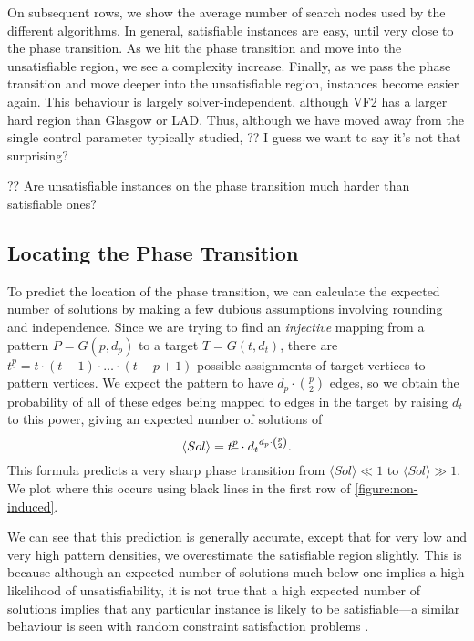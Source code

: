 \documentclass[letterpaper]{article}
\begin{document}
On subsequent rows, we show the average number of search nodes used by the different algorithms. In
general, satisfiable instances are easy, until very close to the phase transition. As we hit the
phase transition and move into the unsatisfiable region, we see a complexity increase. Finally, as
we pass the phase transition and move deeper into the unsatisfiable region, instances become easier
again. This behaviour is largely solver-independent, although VF2 has a larger hard region than
Glasgow or LAD. Thus, although we have moved away from the single control parameter typically
studied, ?? I guess we want to say it's not that surprising?

?? Are unsatisfiable instances on the phase transition much harder than satisfiable ones?

\subsection{Locating the Phase Transition}

To predict the location of the phase transition, we can calculate the expected number of solutions
by making a few dubious assumptions involving rounding and independence. Since we are trying to find
an \emph{injective} mapping from a pattern $P = G(p, d_p)$ to a target $T = G(t, d_t)$, there are
$t^{\underline{p}} = t \cdot (t - 1) \cdot \ldots \cdot (t - p + 1)$ possible assignments of target
vertices to pattern vertices.  We expect the pattern to have $d_p \cdot \binom{p}{2}$ edges, so we
obtain the probability of all of these edges being mapped to edges in the target by raising $d_t$ to
this power, giving an expected number of solutions of \[ \langle Sol \rangle = t^{\underline{p}}
\cdot {d_t}^{d_p \cdot \binom{p}{2}} \textnormal{.} \] This formula predicts a very sharp phase
transition from $\langle Sol \rangle \ll 1$ to $\langle Sol \rangle \gg 1$. We plot where this
occurs using black lines in the first row of \cref{figure:non-induced}.

We can see that this prediction is generally accurate, except that for very low and very high
pattern densities, we overestimate the satisfiable region slightly. This is because although an
expected number of solutions much below one implies a high likelihood of unsatisfiability, it is not
true that a high expected number of solutions implies that any particular instance is likely to be
satisfiable---a similar behaviour is seen with random constraint satisfaction problems
\citep{Smith:1994,Smith:1996}.
\end{document}
